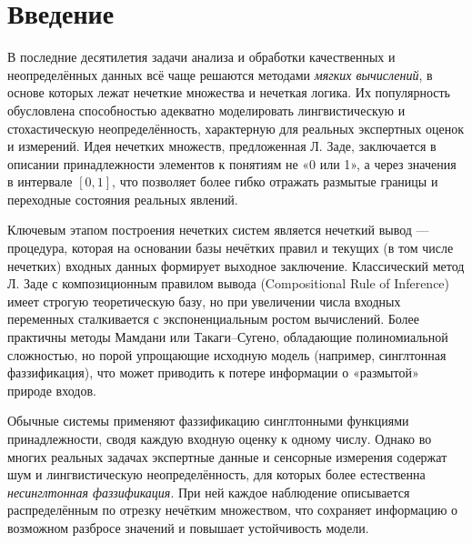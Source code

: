 
\section*{Введение}
\eskdrerun{}


В последние десятилетия задачи анализа и обработки качественных и неопределённых данных всё чаще решаются методами {\it мягких вычислений}, в основе которых лежат нечеткие множества и нечеткая логика. Их популярность обусловлена способностью адекватно моделировать лингвистическую и стохастическую неопределённость, характерную для реальных экспертных оценок и измерений. Идея нечетких множеств, предложенная Л. Заде, заключается в описании принадлежности элементов к понятиям не «0 или 1», а через значения в интервале $[0,1]$, что позволяет более гибко отражать размытые границы и переходные состояния реальных явлений.

Ключевым этапом построения нечетких систем является нечеткий вывод — процедура, которая на основании базы нечётких правил и текущих (в том числе нечетких) входных данных формирует выходное заключение. Классический метод Л. Заде с композиционным правилом вывода (Compositional Rule of Inference) имеет строгую теоретическую базу, но при увеличении числа входных переменных сталкивается с экспоненциальным ростом вычислений. Более практичны методы Мамдани или Такаги–Сугено, обладающие полиномиальной сложностью, но порой упрощающие исходную модель (например, синглтонная фаззификация), что может приводить к потере информации о «размытой» природе входов.

Обычные системы применяют фаззификацию синглтонными функциями принадлежности, сводя каждую входную оценку к одному числу. Однако во многих реальных задачах экспертные данные и сенсорные измерения содержат шум и лингвистическую неопределённость, для которых более естественна {\it несинглтонная фаззификация}. При ней каждое наблюдение описывается распределённым по отрезку нечётким множеством, что сохраняет информацию о возможном разбросе значений и повышает устойчивость модели.


